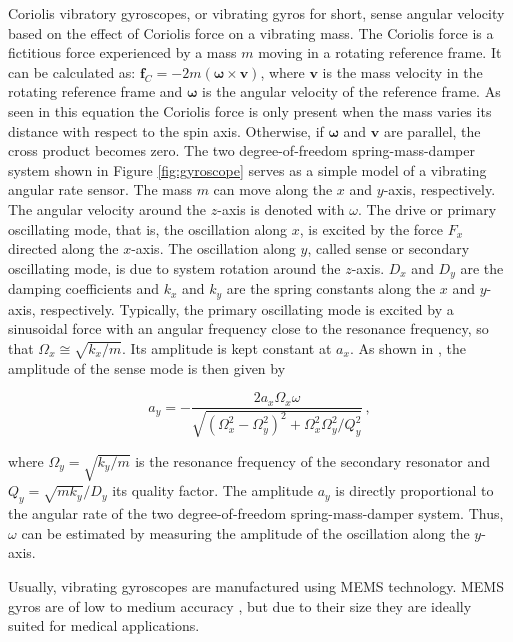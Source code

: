 Coriolis vibratory gyroscopes, or vibrating gyros for short, sense angular velocity based on the effect of Coriolis force on a vibrating mass. The Coriolis force is a fictitious force experienced by a mass $m$ moving in a rotating reference frame. It can be calculated as: $\mathbf{f}_C = -2m(\bm{\omega} \times \mathbf{v})$, where $\mathbf{v}$ is the mass velocity in the rotating reference frame and $\bm{\omega}$ is the angular velocity of the reference frame. As seen in this equation the Coriolis force is only present when the mass varies its distance with respect to the spin axis. Otherwise, if $\bm{\omega}$ and $\mathbf{v}$ are parallel, the cross product becomes zero. The two degree-of-freedom spring-mass-damper system shown in Figure \ref{fig:gyroscope} serves as a simple model of a vibrating angular rate sensor. The mass $m$ can move along the $x$ and $y$-axis, respectively. The angular velocity around the $z$-axis is denoted with $\omega$. The drive or primary oscillating mode, that is, the oscillation along $x$, is excited by the force $F_x$ directed along the $x$-axis. The oscillation along $y$, called sense or secondary oscillating mode, is due to system rotation around the $z$-axis. $D_x$ and $D_y$ are the damping coefficients and $k_x$ and $k_y$ are the spring constants along the $x$ and $y$-axis, respectively. Typically, the primary oscillating mode is excited by a sinusoidal force with an angular frequency close to the resonance frequency, so that $\Omega_x \cong \sqrt{k_x/m}$. Its amplitude is kept constant at $a_x$. As shown in \cite{armenise2010advances}, the amplitude of the sense mode is then given by

\begin{equation}
  a_y = -\frac{2 a_x \Omega_x \omega}{\sqrt{(\Omega^2_x - \Omega^2_y)^2 + \Omega^2_x \Omega^2_y / Q^2_y}}\,,
\end{equation}

\noindent
where $\Omega_y=\sqrt{k_y/m}$ is the resonance frequency of the secondary resonator and $Q_y = \sqrt{m k_y}/D_y$ its quality factor. The amplitude $a_y$ is directly proportional to the angular rate of the two degree-of-freedom spring-mass-damper system. Thus, $\omega$ can be estimated by measuring the amplitude of the oscillation along the $y$-axis.

Usually, vibrating gyroscopes are manufactured using MEMS technology. MEMS gyros are of low to medium accuracy \cite{bhattacharyya_inertial_sensors_applications_13}, but due to their size they are ideally suited for medical applications.

